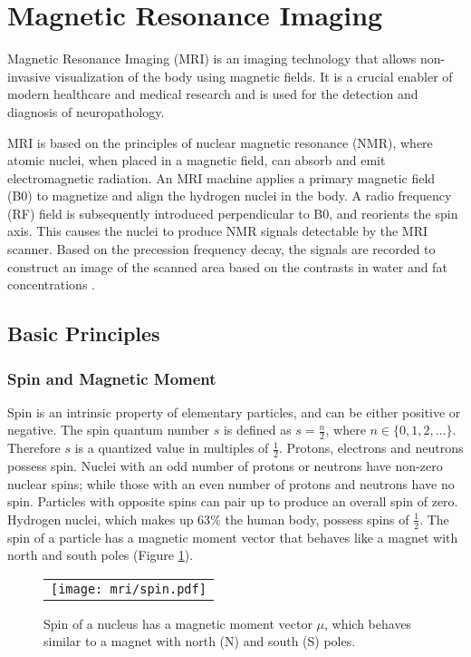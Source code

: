 \section{Magnetic Resonance Imaging}
Magnetic Resonance Imaging (MRI) is an imaging technology that allows non-invasive visualization of the body using magnetic fields. It is a crucial enabler of modern healthcare and medical research and is used for the detection and diagnosis of neuropathology.

MRI is based on the principles of nuclear magnetic resonance (NMR), where atomic nuclei, when placed in a magnetic field, can absorb and emit electromagnetic radiation. An MRI machine applies a primary magnetic field (B0) to magnetize and align the hydrogen nuclei in the body. A radio frequency (RF) field is subsequently introduced perpendicular to B0, and reorients the spin axis. This causes the nuclei to produce NMR signals detectable by the MRI scanner. Based on the precession frequency decay, the signals are recorded to construct an image of the scanned area based on the contrasts in water and fat concentrations \cite{Plewes2012,Johansen-Berg2013}. 

\subsection{Basic Principles}
\subsubsection{Spin and Magnetic Moment}
Spin is an intrinsic property of elementary particles, and can be either positive or negative. The spin quantum number  $s$ is defined as $ s = \frac{n}{2}$, where $n \in \{0,1,2,...\}$. Therefore $s$ is a quantized value in multiples of $\frac{1}{2}$. Protons, electrons and neutrons possess spin. Nuclei with an odd number of protons or neutrons have non-zero nuclear spins; while those with an even number of protons and neutrons have no spin. Particles with opposite spins can pair up to produce an overall spin of zero. Hydrogen nuclei, which makes up 63$\%$ the human body, possess spins of $\frac{1}{2}$. The spin of a particle has a magnetic moment vector that behaves like a magnet with north and south poles (Figure \ref{fig:spin}).


\begin{figure}[ht]
\begin{center}
\begin{tabular}{c}
\texttt{[image: mri/spin.pdf]}
\end{tabular}
\caption{Spin of a nucleus has a magnetic moment vector $\mu$, which behaves similar to a magnet with north (N) and south (S) poles.}
\label{fig:spin}
\end{center}
\end{figure}


